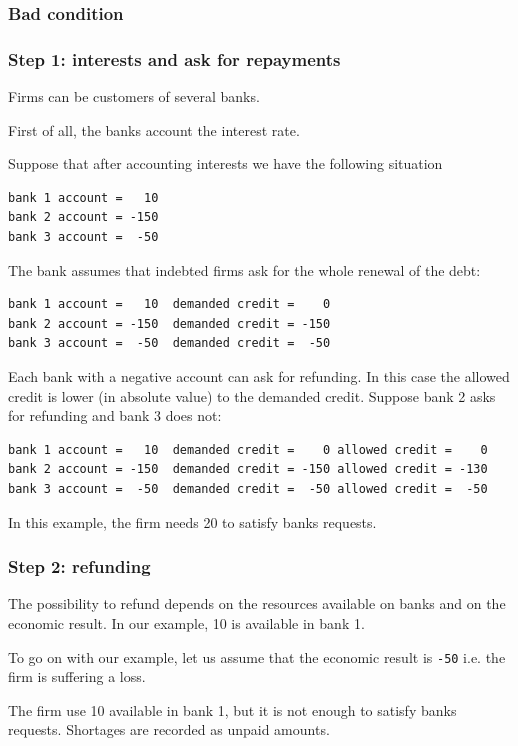 \documentclass{article}
\begin{document}
\subsubsection{Bad condition}
\subsubsection*{Step 1: interests and ask for repayments}
Firms can be customers of several banks.

First of all, the banks account the interest rate.

Suppose that after accounting interests we have the following situation
\begin{verbatim}
bank 1 account =   10
bank 2 account = -150
bank 3 account =  -50
\end{verbatim}

The bank assumes that indebted firms ask for the whole renewal of the debt:

\begin{verbatim}
bank 1 account =   10  demanded credit =    0
bank 2 account = -150  demanded credit = -150
bank 3 account =  -50  demanded credit =  -50
\end{verbatim}

Each bank with a negative account can ask for refunding. In this case the allowed credit is lower (in absolute value) to the demanded credit.
Suppose bank 2 asks for refunding and bank 3 does not:

\begin{verbatim}
bank 1 account =   10  demanded credit =    0 allowed credit =    0
bank 2 account = -150  demanded credit = -150 allowed credit = -130 
bank 3 account =  -50  demanded credit =  -50 allowed credit =  -50
\end{verbatim}

In this example, the firm needs 20 to satisfy banks requests.

\subsubsection*{Step 2: refunding}

The possibility to refund depends on the resources available on banks and on the economic result. In our example, 10 is available in bank 1.

To go on with our example, let us assume that the economic result is \verb+-50+ i.e. the firm is suffering a loss.

The firm use 10 available in bank 1, but it is not enough to satisfy banks requests. Shortages are recorded as unpaid amounts.
\end{document}
